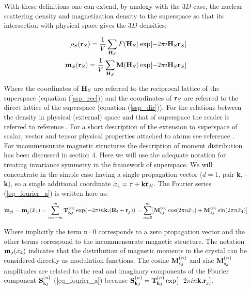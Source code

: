 \documentclass[10pt]{article}
\begin{document}
With these definitions one can extend, by analogy with the $3D$ case, the nuclear scattering density and magnetization density to the superspace so that its intersection with physical space gives the $3D$ densities:

\begin{eqnarray} 
{\rho}_{S}({\bf r}_S) = \frac{1}{V} \sum_{{\bf H}_S} F({\bf H}_S) \exp[-2\pi i {\bf H}_S {\bf r}_S]\\
{\bf m}_{S}({\bf r}_S) = \frac{1}{V} \sum_{{\bf H}_S} {\bf M}({\bf H}_S) \exp[-2\pi i {\bf H}_S {\bf r}_S]
\end{eqnarray}

Where the coordinates of ${\bf H}_S$ are referred to the reciprocal lattice of the superspace (equation (\ref{ssp_rec})) and the coordinates of  ${\bf r}_S$ are referred to the direct lattice of the superspace (equation (\ref{ssp_dir})). For the relations between the density in physical (external) space and that of superspace the reader is referred to reference \cite{van Smaalen}. For a short description of the extension to superspace of scalar, vector and tensor physical properties attached to atoms see reference \cite{Yamamoto}.\\


For incommensurate magnetic structures the description of moment distribution has been discussed in section 4. Here we will use the adequate notation for treating invariance symmetry in the framework of superspace. We will concentrate in the simple case having a single propagation vector ($d=1$, pair {\bf k}, -{\bf k}), so a single additional coordinate $\bar{x}_4=\tau + {\bf k} {\bf \bar{r}}_{jl}  $. The Fourier series (\ref{eq_fourier_a}) is written here as:
\begin{equation}
{\bf m}_{jl} ={\bf m}_j(\bar{x}_4) = \sum\limits_{n = -m}^{m} {\bf T}_{{\bf k}j}^{(n)} \exp(- 2\pi i n {\bf k}. ({\bf R}_l + {\bf r}_j))=\sum\limits_{n = 0}^{m} [{\bf M}_{cj}^{(n)} \cos(2\pi n\bar{x}_4) + {\bf M}_{sj}^{(n)} \sin(2\pi n\bar{x}_4)]
\end{equation}

Where implicitly the term n=0 corresponds to a zero propagation vector and the other terms correspond to the incommensurate magnetic structure. The notation ${\bf m}_j(\bar{x}_4)$ indicates that the distribution of magnetic moments in the crystal can be considered directly as modulation functions. The cosine ${\bf M}_{cj}^{(n)}$ and sine ${\bf M}_{sj}^{(n)}$ amplitudes are related to the real and imaginary components of the Fourier component ${\bf S}_{{\bf k}j}^{(n)}$ (\ref{eq_fourier_a}) because ${\bf S}_{{\bf k}j}^{(n)}={\bf T}_{{\bf k}j}^{(n)}\exp[{- 2\pi i n{\bf k}. {\bf r}_j}]$.
\end{document}
